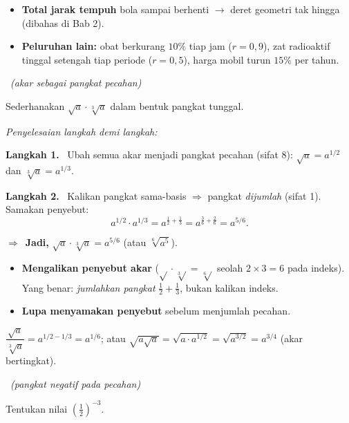 \documentclass[11pt,a4paper]{report}
\theoremstyle{gaya}
\newcommand{\jawab}{\par\smallskip\noindent\textit{\textcolor{oranye}{Penyelesaian langkah demi langkah:}}\par\smallskip}
\newcommand{\langkah}[1]{\par\smallskip\noindent\textbf{\textcolor{biru}{Langkah #1.}}\ }
\newcommand{\jadi}{\par\smallskip\noindent$\Rightarrow$\ \textbf{Jadi, }}
\newcommand{\soalno}[2]{%
  \par\bigskip
  \noindent{\large\bfseries\color{ungu}\rule[-2pt]{4pt}{14pt}\ Soal #1}%
  \ {\normalfont\itshape\color{gray}(#2)}\par\nopagebreak\smallskip}
\begin{document}
\begin{variasi}
\begin{itemize}[leftmargin=*,topsep=2pt]
  \item \textbf{Total jarak tempuh} bola sampai berhenti $\to$ deret geometri tak
  hingga (dibahas di Bab 2).
  \item \textbf{Peluruhan lain:} obat berkurang $10\%$ tiap jam ($r=0{,}9$), zat
  radioaktif tinggal setengah tiap periode ($r=0{,}5$), harga mobil turun $15\%$
  per tahun.
\end{itemize}
\end{variasi}

\soalno{1.1.8}{akar sebagai pangkat pecahan}
\begin{soalbox}{}
Sederhanakan $\sqrt{a}\cdot\sqrt[3]{a}$ dalam bentuk pangkat tunggal.
\end{soalbox}

\jawab
\langkah{1} Ubah semua akar menjadi pangkat pecahan (sifat 8):
$\sqrt{a}=a^{1/2}$ dan $\sqrt[3]{a}=a^{1/3}$.
\langkah{2} Kalikan pangkat sama-basis $\Rightarrow$ pangkat \emph{dijumlah}
(sifat 1). Samakan penyebut:
\[
a^{1/2}\cdot a^{1/3} = a^{\frac12+\frac13} = a^{\frac{3}{6}+\frac{2}{6}} = a^{5/6}.
\]
\jadi $\sqrt a\cdot\sqrt[3]a = a^{5/6}$ (atau $\sqrt[6]{a^5}$).

\begin{jebakan}
\begin{itemize}[leftmargin=*,topsep=2pt]
  \item \textbf{Mengalikan penyebut akar} ($\sqrt{}\cdot\sqrt[3]{}=\sqrt[6]{}$
  seolah $2\times3=6$ pada indeks). Yang benar: \emph{jumlahkan pangkat}
  $\frac12+\frac13$, bukan kalikan indeks.
  \item \textbf{Lupa menyamakan penyebut} sebelum menjumlah pecahan.
\end{itemize}
\end{jebakan}

\begin{variasi}
$\dfrac{\sqrt a}{\sqrt[3]{a}} = a^{1/2-1/3}=a^{1/6}$; atau
$\sqrt{a\sqrt a}=\sqrt{a\cdot a^{1/2}}=\sqrt{a^{3/2}}=a^{3/4}$ (akar bertingkat).
\end{variasi}

\soalno{1.1.9}{pangkat negatif pada pecahan}
\begin{soalbox}{}
Tentukan nilai $\left(\tfrac{1}{2}\right)^{-3}$.
\end{soalbox}
\end{document}
